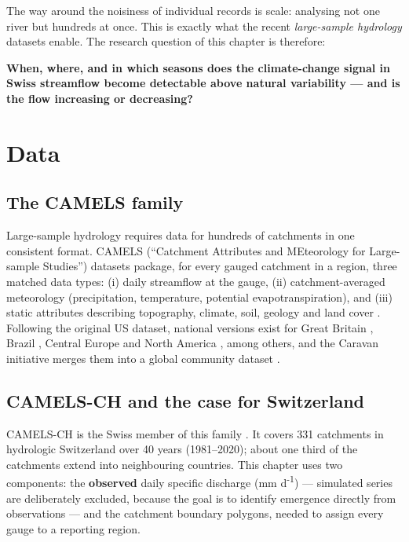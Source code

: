 \documentclass[
]{krantz}
\renewenvironment{quote}{\begin{VF}}{\end{VF}}
\begin{document}
The way around the noisiness of individual records is scale: analysing not one river but hundreds at once. This is exactly what the recent \emph{large-sample hydrology} datasets enable. The research question of this chapter is therefore:

\begin{quote}
\textbf{When, where, and in which seasons does the climate-change signal in Swiss streamflow become detectable above natural variability --- and is the flow increasing or decreasing?}
\end{quote}

\section{Data}\label{data}

\subsection{The CAMELS family}\label{the-camels-family}

Large-sample hydrology requires data for hundreds of catchments in one consistent format. CAMELS (``Catchment Attributes and MEteorology for Large-sample Studies'') datasets package, for every gauged catchment in a region, three matched data types: (i) daily streamflow at the gauge, (ii) catchment-averaged meteorology (precipitation, temperature, potential evapotranspiration), and (iii) static attributes describing topography, climate, soil, geology and land cover \citep{addor2017}. Following the original US dataset, national versions exist for Great Britain \citep{coxon2020}, Brazil \citep{chagas2020}, Central Europe \citep{klingler2021} and North America \citep{arsenault2020}, among others, and the Caravan initiative merges them into a global community dataset \citep{kratzert2023}.

\subsection{CAMELS-CH and the case for Switzerland}\label{camels-ch-and-the-case-for-switzerland}

CAMELS-CH is the Swiss member of this family \citep{hoege2023}. It covers 331 catchments in hydrologic Switzerland over 40 years (1981--2020); about one third of the catchments extend into neighbouring countries. This chapter uses two components: the \textbf{observed} daily specific discharge (mm d\textsuperscript{-1}) --- simulated series are deliberately excluded, because the goal is to identify emergence directly from observations --- and the catchment boundary polygons, needed to assign every gauge to a reporting region.
\end{document}
